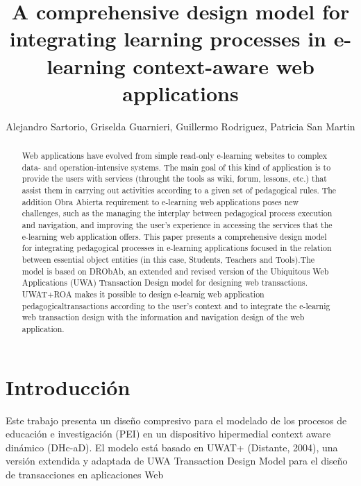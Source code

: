 \documentclass{llncs}
\begin{document}
\title{A comprehensive design model for integrating
learning  processes in e-learning context-aware web applications}

\author{Alejandro Sartorio, Griselda Guarnieri, Guillermo Rodriguez, Patricia San Martin}



\maketitle


\begin{abstract}
Web applications have evolved from simple read-only e-learning websites to
complex data- and operation-intensive systems. The main goal of this kind of
application is to provide the users with services (throught the tools as wiki, forum, lessons, etc.) that assist them in carrying out activities according to a given set of pedagogical rules. The addition Obra Abierta requirement to e-learning web applications poses new challenges, such as the managing the
interplay between pedagogical process execution and navigation, and improving
the user’s experience in accessing the services that the e-learning web application offers.
This paper presents a comprehensive design model for integrating pedagogical
processes in e-learning applications focused in the relation between essential object entities (in this case, Students, Teachers and Tools).The model is based on DRObAb, an extended
and revised version of the Ubiquitous Web Applications (UWA) Transaction
Design model for designing web transactions. UWAT+ROA makes it possible to
design e-learnig web application pedagogicaltransactions according to the user’s context and to
integrate the e-learnig web transaction design with the information and navigation design
of the web application.
\end{abstract}


\section{Introducción}

Este trabajo presenta un diseño compresivo para el modelado de los procesos de educación e investigación (PEI) en un dispositivo hipermedial context aware dinámico (DHc-aD). El modelo está basado en UWAT+ (Distante, 2004), una versión extendida y adaptada de UWA Transaction Design Model para el diseño de transacciones en aplicaciones Web  
\end{document}
